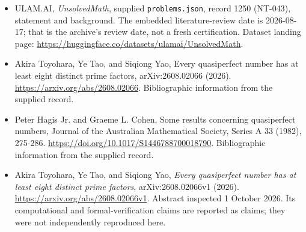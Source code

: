 \documentclass[11pt,a4paper]{article}
\begin{document}
{\small

\begin{itemize}

\item[\hypertarget{source:1250:1}{S1}] ULAM.AI, \emph{UnsolvedMath}, supplied \texttt{problems.json}, record 1250 (NT-043), statement and background. The embedded literature-review date is 2026-08-17; that is the archive’s review date, not a fresh certification. Dataset landing page: \url{https://huggingface.co/datasets/ulamai/UnsolvedMath}.

\item[\hypertarget{source:1250:2}{S2}] Akira Toyohara, Ye Tao, and Siqiong Yao, Every quasiperfect number has at least eight distinct prime factors, arXiv:2608.02066 (2026). \url{https://arxiv.org/abs/2608.02066}. Bibliographic information from the supplied record.

\item[\hypertarget{source:1250:3}{S3}] Peter Hagis Jr. and Graeme L. Cohen, Some results concerning quasiperfect numbers, Journal of the Australian Mathematical Society, Series A 33 (1982), 275-286. \url{https://doi.org/10.1017/S1446788700018790}. Bibliographic information from the supplied record.


\item[E1] Akira Toyohara, Ye Tao, and Siqiong Yao,
\emph{Every quasiperfect number has at least eight distinct prime
factors}, arXiv:2608.02066v1 (2026).
\url{https://arxiv.org/abs/2608.02066v1}. Abstract inspected
1 October 2026. Its computational and formal-verification claims are
reported as claims; they were not independently reproduced here.

\end{itemize}

}

\label{end:1250}
\end{document}

